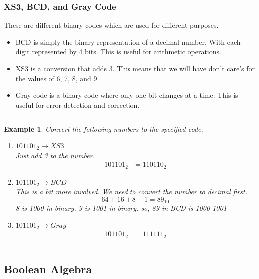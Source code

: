 \documentclass[12pt]{article}
\newtheorem{example}{Example}
\newenvironment{examp}
{
    \vspace{0.5cm}
    \hrule
    \begin{example}\upshape
}
{
    \end{example}
    \hrule
    \vspace{0.5cm}
}
\begin{document}
\subsubsection{XS3, BCD, and Gray Code}
These are different binary codes which are used for different purposes.
\begin{itemize}
	\item BCD is simply the binary representation of a decimal number. With each
	      digit represented by 4 bits. This is useful for arithmetic operations.
	\item XS3 is a
	      conversion that adds 3. This means that we will have don't care's for the
	      values of 6, 7, 8, and 9.
	\item Gray code is a binary code where only one bit
	      changes at a time. This is useful for error detection and correction.
\end{itemize}
\begin{examp}
	Convert the following numbers to the specified code.
	\begin{enumerate}
		\item \(101101_2 \rightarrow XS3\)\\
		      Just add 3 to the number.
		      \begin{align*}
			      101101_2 & = 110110_2
		      \end{align*}
		\item \(101101_2 \rightarrow BCD\)\\
		      This is a bit more involved. We need to convert the number to decimal first.
		      \[64 + 16 + 8 + 1 = 89_{10}\]
		      8 is 1000 in binary, 9 is 1001 in binary.
		      so, 89 in BCD is 1000 1001
		\item \(101101_2 \rightarrow Gray\)
		      \begin{align*}
			      101101_2 & = 111111_2
		      \end{align*}
	\end{enumerate}
\end{examp}
\subsection{Boolean Algebra}
\end{document}
